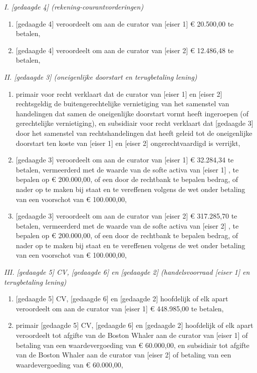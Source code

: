 \documentclass[
  dutch,
  a4paper,
]{article}
\begin{document}
\emph{I. {[}gedaagde 4{]} (rekening-courantvorderingen)}

\begin{enumerate}
\def\labelenumi{\arabic{enumi}.}
\item
  {[}gedaagde 4{]} veroordeelt om aan de curator van {[}eiser 1{]} € 20.500,00 te betalen,
\item
  {[}gedaagde 4{]} veroordeelt om aan de curator van {[}eiser 2{]} € 12.486,48 te betalen,
\end{enumerate}

\emph{II. {[}gedaagde 3{]} (oneigenlijke doorstart en terugbetaling lening)}

\begin{enumerate}
\def\labelenumi{\arabic{enumi}.}
\setcounter{enumi}{2}
\item
  primair voor recht verklaart dat de curator van {[}eiser 1{]} en {[}eiser 2{]} rechtsgeldig de buitengerechtelijke vernietiging van het samenstel van handelingen dat samen de oneigenlijke doorstart vormt heeft ingeroepen (of gerechtelijke vernietiging), en subsidiair voor recht verklaart dat {[}gedaagde 3{]} door het samenstel van rechtshandelingen dat heeft geleid tot de oneigenlijke doorstart ten koste van {[}eiser 1{]} en {[}eiser 2{]} ongerechtvaardigd is verrijkt,
\item
  {[}gedaagde 3{]} veroordeelt om aan de curator van {[}eiser 1{]} € 32.284,34 te betalen, vermeerderd met de waarde van de softe activa van {[}eiser 1{]} , te bepalen op € 200.000,00, of een door de rechtbank te bepalen bedrag, of nader op te maken bij staat en te vereffenen volgens de wet onder betaling van een voorschot van € 100.000,00,
\item
  {[}gedaagde 3{]} veroordeelt om aan de curator van {[}eiser 2{]} € 317.285,70 te betalen, vermeerderd met de waarde van de softe activa van {[}eiser 2{]} , te bepalen op € 200.000,00, of een door de rechtbank te bepalen bedrag, of nader op te maken bij staat en te vereffenen volgens de wet onder betaling van een voorschot van € 100.000,00,
\end{enumerate}

\emph{III. {[}gedaagde 5{]} CV, {[}gedaagde 6{]} en {[}gedaagde 2{]} (handelsvoorraad {[}eiser 1{]} en terugbetaling lening)}

\begin{enumerate}
\def\labelenumi{\arabic{enumi}.}
\setcounter{enumi}{5}
\item
  {[}gedaagde 5{]} CV, {[}gedaagde 6{]} en {[}gedaagde 2{]} hoofdelijk of elk apart veroordeelt om aan de curator van {[}eiser 1{]} € 448.985,00 te betalen,
\item
  primair {[}gedaagde 5{]} CV, {[}gedaagde 6{]} en {[}gedaagde 2{]} hoofdelijk of elk apart veroordeelt tot afgifte van de Boston Whaler aan de curator van {[}eiser 1{]} of betaling van een waardevergoeding van € 60.000,00, en subsidiair tot afgifte van de Boston Whaler aan de curator van {[}eiser 2{]} of betaling van een waardevergoeding van € 60.000,00,
\end{enumerate}
\end{document}

